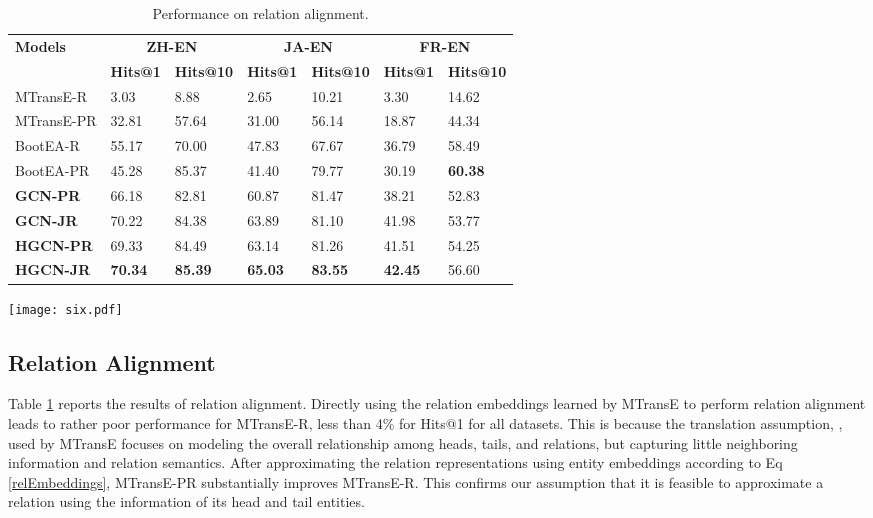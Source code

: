 \documentclass[11pt,a4paper]{article}
\begin{document}
\begin{table}
	\centering
\scriptsize
	\begin{tabular}{p{38pt}|p{14pt}<{\centering}p{18pt}<{\centering}|p{14pt}<{\centering}p{18pt}<{\centering}|p{14pt}<{\centering}p{18pt}<{\centering}}
		\toprule
		\multirow{2}{*}{\bf Models} & \multicolumn{2}{c|}{\bf ZH-EN} & \multicolumn{2}{c|}{\bf JA-EN} & \multicolumn{2}{c}{ \bf FR-EN}  \\
		& \tiny \bf Hits@1 & \tiny \bf Hits@10 & \tiny \bf Hits@1 &\tiny \bf Hits@10 & \tiny \bf Hits@1 &\tiny \bf Hits@10\\
		\midrule
		MTransE-R& 3.03 & 8.88 & 2.65 & 10.21 & 3.30 & 14.62 \\
		MTransE-PR& 32.81 & 57.64 & 31.00 & 56.14 & 18.87 & 44.34 \\
		BootEA-R& 55.17 & 70.00 & 47.83 & 67.67 & 36.79 & 58.49 \\
		BootEA-PR & 45.28 & 85.37 & 41.40 & 79.77 & 30.19 & \bf 60.38 \\
		\midrule
		\bf GCN-PR & 66.18 & 82.81 & 60.87 & 81.47 & 38.21 & 52.83 \\
		\bf GCN-JR & 70.22 & 84.38 & 63.89 & 81.10 & 41.98 & 53.77 \\
		\bf HGCN-PR & 69.33 & 84.49 & 63.14 & 81.26 & 41.51 & 54.25 \\
		\bf HGCN-JR & \bf 70.34 & \bf 85.39 & \bf 65.03 & \bf 83.55 & \bf 42.45 & 56.60 \\
		\bottomrule
	\end{tabular}
	\caption{Performance on relation alignment.}
	\label{Relresults}
\end{table}

\begin{figure*}[t!]
	\centering
	\texttt{[image: six.pdf]}
	\caption{(a)-(c) report the performance for entity alignment of HGCN-JE and BootEA when they are trained with different proportions of seed entity alignments on the three DBP15K datasets. (d)-(f) show the relation alignment performance of HGCN-JR and BootEA-R under corresponding conditions. The x-axes are the proportions of seed alignments, and the y-axes are Hits@1 scores.}
	\label{six}
\end{figure*}

\subsection{Relation Alignment\label{sec:result:ra}}
Table \ref{Relresults} reports the results of relation alignment. Directly using the relation embeddings learned by MTransE to perform
relation alignment leads to rather poor performance for MTransE-R, less than 4\% for Hits@1 for all datasets. This is because the
translation assumption, , used by MTransE focuses on modeling the overall relationship among heads, tails, and
relations, but capturing little neighboring information and relation semantics. After approximating the relation representations using
entity embeddings according to Eq \ref{relEmbeddings}, MTransE-PR substantially improves MTransE-R. This confirms our assumption that it is
feasible to approximate a relation using the information of its head and tail entities.
\end{document}
